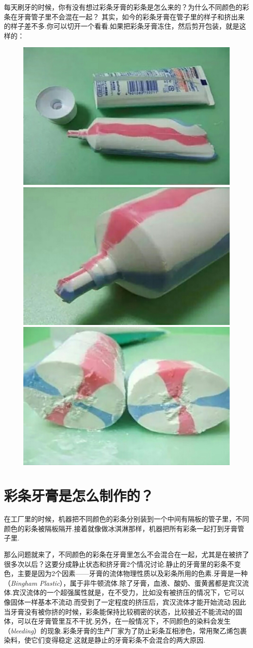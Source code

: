 \newpage
{}
\begin{multicols}{2}

每天刷牙的时候，你有没有想过彩条牙膏的彩条是怎么来的？为什么不同颜色的彩条在牙膏管子里不会混在一起？
其实，如今的彩条牙膏在管子里的样子和挤出来的样子差不多.你可以切开一个看看.如果把彩条牙膏冻住，然后剪开包装，就是这样的：
\begin{figure}[H]
    \centering
    \includegraphics[width=0.333\linewidth]{Interstellar/IMG/201907/03a.jpg}\includegraphics[width=0.333\linewidth]{Interstellar/IMG/201907/03b.jpg}\includegraphics[width=0.333\linewidth]{Interstellar/IMG/201907/03c.jpg}
    \caption{}
    
\end{figure}


\section*{彩条牙膏是怎么制作的？}

在工厂里的时候，机器把不同颜色的彩条分别装到一个中间有隔板的管子里，不同颜色的彩条被隔板隔开.接着就像做冰淇淋那样，机器把所有彩条一起打到牙膏管子里.


那么问题就来了，不同颜色的彩条在牙膏里怎么不会混合在一起，尤其是在被挤了很多次以后？这要分成静止状态和挤牙膏2个情况讨论.静止的牙膏里的彩条不变色，主要是因为2个因素——牙膏的流体物理性质以及彩条所用的色素.牙膏是一种（\textit{Bingham Plastic}\/），属于非牛顿流体.除了牙膏，血液、酸奶、蛋黄酱都是宾汉流体.宾汉流体的一个超强属性就是，在不受力，比如没有被挤压的情况下，它可以像固体一样基本不流动.而受到了一定程度的挤压后，宾汉流体才能开始流动.因此当牙膏没有被你挤的时候，彩条能保持比较稠密的状态，比较接近不能流动的固体，可以在牙膏管里互不干扰.另外，在一般情况下，不同颜色的染料会发生（\textit{bleeding}\/）的现象.彩条牙膏的生产厂家为了防止彩条互相渗色，常用聚乙烯包裹染料，使它们变得稳定.这就是静止的牙膏彩条不会混合的两大原因.
\end{multicols}

